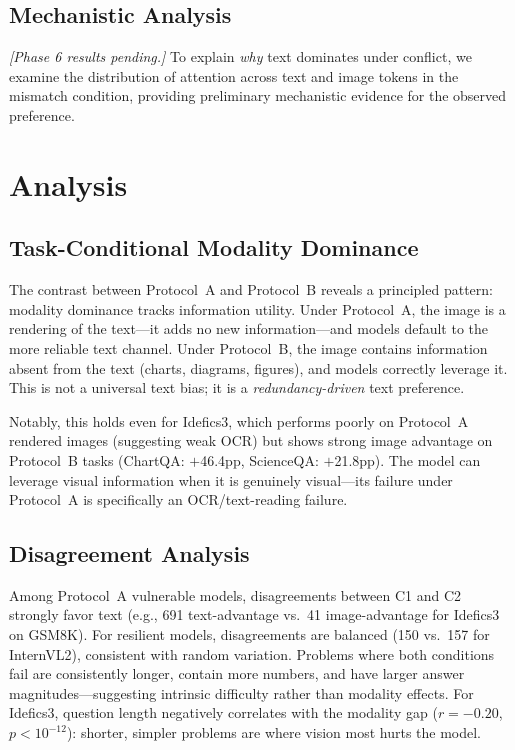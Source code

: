 \documentclass[11pt]{article}
\begin{document}
\subsection{Mechanistic Analysis}
\label{sec:mechanistic}
\textit{[Phase 6 results pending.]} To explain \textit{why} text dominates under conflict, we examine the distribution of attention across text and image tokens in the mismatch condition, providing preliminary mechanistic evidence for the observed preference.

\section{Analysis}

\subsection{Task-Conditional Modality Dominance}

The contrast between Protocol~A and Protocol~B reveals a principled pattern: modality dominance tracks information utility. Under Protocol~A, the image is a rendering of the text---it adds no new information---and models default to the more reliable text channel. Under Protocol~B, the image contains information absent from the text (charts, diagrams, figures), and models correctly leverage it. This is not a universal text bias; it is a \textit{redundancy-driven} text preference.

Notably, this holds even for Idefics3, which performs poorly on Protocol~A rendered images (suggesting weak OCR) but shows strong image advantage on Protocol~B tasks (ChartQA: $+$46.4pp, ScienceQA: $+$21.8pp). The model can leverage visual information when it is genuinely visual---its failure under Protocol~A is specifically an OCR/text-reading failure.

\subsection{Disagreement Analysis}

Among Protocol~A vulnerable models, disagreements between C1 and C2 strongly favor text (e.g., 691 text-advantage vs.\ 41 image-advantage for Idefics3 on GSM8K). For resilient models, disagreements are balanced (150 vs.\ 157 for InternVL2), consistent with random variation. Problems where both conditions fail are consistently longer, contain more numbers, and have larger answer magnitudes---suggesting intrinsic difficulty rather than modality effects. For Idefics3, question length negatively correlates with the modality gap ($r = -0.20$, $p < 10^{-12}$): shorter, simpler problems are where vision most hurts the model.
\end{document}
